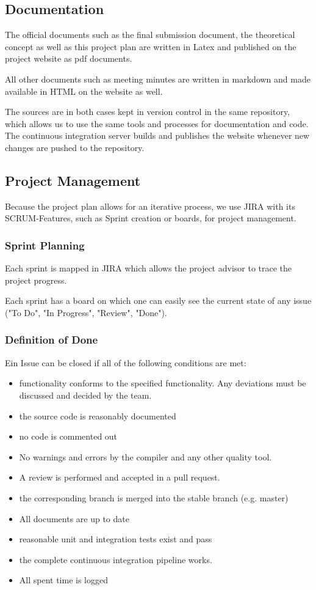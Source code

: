 \documentclass[a4paper]{article}
\begin{document}
\subsection{Documentation}
The official documents such as the final submission document, the theoretical concept as well as this project plan are written in Latex and published on the project website as pdf documents.

All other documents such as meeting minutes are written in markdown and made available in HTML on the website as well.

The sources are in both cases kept in version control in the same repository, which allows us to use the same tools and processes for documentation and code. The continuous integration server builds and publishes the website whenever new changes are pushed to the repository.

\subsection{Project Management}
Because the project plan allows for an iterative process, we use JIRA with its SCRUM-Features, such as Sprint creation or boards, for project management. 

\subsubsection{Sprint Planning}
Each sprint is mapped in JIRA which allows the project advisor to trace the project progress.

Each sprint has a board on which one can easily see the current state of any issue ("To Do", "In Progress", "Review", "Done").


\subsubsection{Definition of Done}
Ein Issue can be closed if all of the following conditions are met:

\begin{itemize}
	\item functionality conforms to the specified functionality. Any deviations must be discussed and decided by the team.
	\item the source code is reasonably documented
	\item no code is commented out
	\item No warnings and errors by the compiler and any other quality tool.
	\item A review is performed and accepted in a pull request.
	\item the corresponding branch is merged into the stable branch (e.g. master)
	\item All documents are up to date
	\item reasonable unit and integration tests exist and pass
	\item the complete continuous integration pipeline works.
	\item All spent time is logged
\end{itemize}
\end{document}
